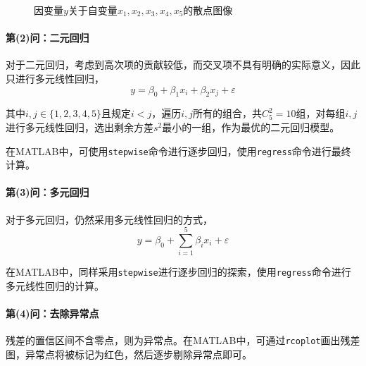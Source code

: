 \begin{figure}[H]
{    }
    \caption{因变量$y$关于自变量$x_1,x_2,x_3,x_4,x_5$的散点图像}
    \label{fig:ex7_scatter}
\end{figure}

\paragraph{第(2)问：二元回归} 对于二元回归，考虑到高次项的贡献较低，而交叉项不具有明确的实际意义，因此只进行多元线性回归，
\begin{equation}
    y = \beta_0 + \beta_1 x_i + \beta_2 x_j + \varepsilon
\end{equation}

其中$i,j \in \{1,2,3,4,5\}$且规定$i < j$，遍历$i,j$所有的组合，共$C_5^2 = 10$组，对每组$i,j$进行多元线性回归，选出剩余方差$s^2$最小的一组，作为最优的二元回归模型。

在MATLAB中，可使用\texttt{stepwise}命令进行逐步回归，使用\texttt{regress}命令进行最终计算。

\paragraph{第(3)问：多元回归} 对于多元回归，仍然采用多元线性回归的方式，
\begin{equation}
    y = \beta_0 + \sum_{i=1}^5 \beta_i x_i + \varepsilon
\end{equation}

在MATLAB中，同样采用\texttt{stepwise}进行逐步回归的探索，使用\texttt{regress}命令进行多元线性回归的计算。

\paragraph{第(4)问：去除异常点} 残差的置信区间不含零点，则为异常点。在MATLAB中，可通过\texttt{rcoplot}画出残差图，异常点将被标记为红色，然后逐步剔除异常点即可。

